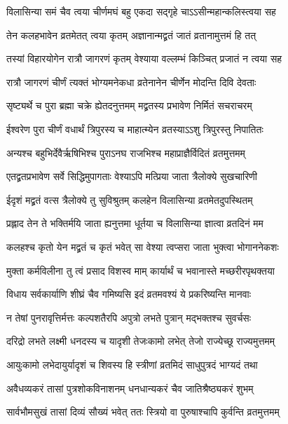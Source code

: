 \twolineshloka
{विलासिन्या समं चैव त्वया चीर्णमघं बहु}
{एकदा सद्गृहे चाऽऽसीन्महान्कलिस्त्वया सह} %

\twolineshloka
{तेन कलहभावेन व्रतमेतत् त्वया कृतम्}
{अज्ञानान्मद्व्रतं जातं व्रतानामुत्तमं हि तत्} %

\twolineshloka
{तस्यां विहारयोगेन रात्रौ जागरणं कृतम्}
{वेश्याया वल्लम्भं किञ्चित् प्रजातं न त्वया सह} %

\twolineshloka
{रात्रौ जागरणं चीर्णं त्यक्तं भोग्यमनेकधा}
{व्रतेनानेन चीर्णेन मोदन्ति दिवि देवताः} %

\twolineshloka
{सृष्ट्यर्थे च पुरा ब्रह्मा चक्रे ह्येतदनुत्तमम्}
{मद्व्रतस्य प्रभावेण निर्मितं सचराचरम्} %

\twolineshloka
{ईश्वरेण पुरा चीर्णं वधार्थं त्रिपुरस्य च}
{माहात्म्येन व्रतस्याऽऽशु त्रिपुरस्तु निपातितः} %

\twolineshloka
{अन्यश्च बहुभिर्देवैर्ऋषिभिश्च पुराऽनघ}
{राजभिश्च महाप्राज्ञैर्विदितं व्रतमुत्तमम्} %

\twolineshloka
{एतद्व्रतप्रभावेण सर्वे सिद्धिमुपागताः}
{वेश्याऽपि मत्प्रिया जाता त्रैलोक्ये सुखचारिणी} %

\twolineshloka
{ईदृशं मद्व्रतं वत्स त्रैलोक्ये तु सुविश्रुतम्}
{कलहेन विलासिन्या व्रतमेतदुपस्थितम्} %

\twolineshloka
{प्रह्लाद तेन ते भक्तिर्मयि जाता ह्यनुत्तमा}
{धूर्तया च विलासिन्या ज्ञात्वा व्रतदिनं मम} %

\twolineshloka
{कलहश्च कृतो येन मद्व्रतं च कृतं भवेत्}
{सा वेश्या त्वप्सरा जाता भुक्त्वा भोगाननेकशः} %

\twolineshloka
{मुक्ता कर्मविलीना तु त्वं प्रसाद विशस्व माम्}
{कार्यार्थं च भवानास्ते मच्छरीरपृथक्तया} %

\twolineshloka
{विधाय सर्वकार्याणि शीघ्रं चैव गमिष्यसि}
{इदं व्रतमवश्यं ये प्रकरिष्यन्ति मानवाः} %

\twolineshloka
{न तेषां पुनरावृत्तिर्मत्तः कल्पशतैरपि}
{अपुत्रो लभते पुत्रान् मद्भक्तश्च सुवर्चसः} %

\twolineshloka
{दरिद्रो लभते लक्ष्मी धनदस्य च यादृशी}
{तेजःकामो लभेत् तेजो राज्येच्छू राज्यमुत्तमम्} %

\twolineshloka
{आयुःकामो लभेदायुर्यादृशं च शिवस्य हि}
{स्त्रीणां व्रतमिदं साधुपुत्रदं भाग्यदं तथा} %

\twolineshloka
{अवैधव्यकरं तासां पुत्रशोकविनाशनम्}
{धनधान्यकरं चैव जातिश्रैष्ठ्यकरं शुभम्} %

\twolineshloka
{सार्वभौमसुखं तासां दिव्यं सौख्यं भवेत् ततः}
{स्त्रियो वा पुरुषाश्चापि कुर्वन्ति व्रतमुत्तमम्} %

